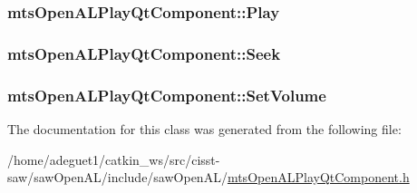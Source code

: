 \hypertarget{classmts_open_a_l_play_qt_component_a2bdeaa7fa3b765c6bdfbf49245294d35}{
\subsubsection[{Play}]{ mts\-Open\-A\-L\-Play\-Qt\-Component\-::\-Play}}\label{classmts_open_a_l_play_qt_component_a2bdeaa7fa3b765c6bdfbf49245294d35}
\hypertarget{classmts_open_a_l_play_qt_component_ac03d46d104f3e3c595b7d35438fb1350}{
\subsubsection[{Seek}]{ mts\-Open\-A\-L\-Play\-Qt\-Component\-::\-Seek}}\label{classmts_open_a_l_play_qt_component_ac03d46d104f3e3c595b7d35438fb1350}
\hypertarget{classmts_open_a_l_play_qt_component_abf083f38245931ac88a894bd195a5fe5}{
\subsubsection[{Set\-Volume}]{ mts\-Open\-A\-L\-Play\-Qt\-Component\-::\-Set\-Volume}}\label{classmts_open_a_l_play_qt_component_abf083f38245931ac88a894bd195a5fe5}


The documentation for this class was generated from the following file\-:\begin{DoxyCompactItemize}
\item 
/home/adeguet1/catkin\-\_\-ws/src/cisst-\/saw/saw\-Open\-A\-L/include/saw\-Open\-A\-L/\hyperlink{mts_open_a_l_play_qt_component_8h}{mts\-Open\-A\-L\-Play\-Qt\-Component.\-h}\end{DoxyCompactItemize}
